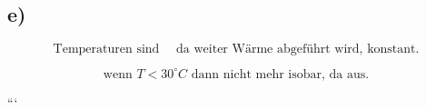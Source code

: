 

\subsection*{e)}

\[
\text{Temperaturen sind } \quad \text{da weiter Wärme abgeführt wird, konstant.}
\]

\[
\text{wenn } T < 30^\circ C \text{ dann nicht mehr isobar, da aus.}
\]

```